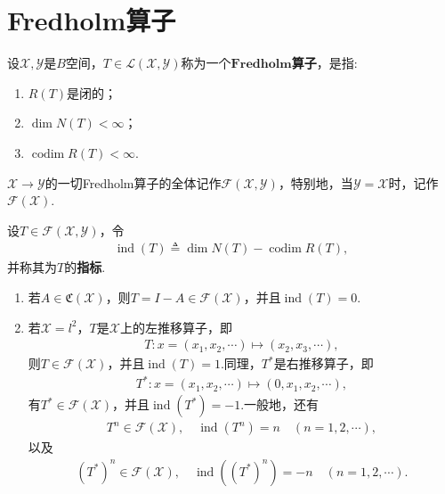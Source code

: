 \documentclass[../../main.tex]{subfiles}%
\begin{document}
\section{Fredholm算子}

\begin{definition}
设$\mathscr{X},\mathscr{Y}$是$B$空间，$T\in\mathscr{L}(\mathscr{X},\mathscr{Y})$称为一个$\mathbf{Fredholm}$\textbf{算子}，是指:
\begin{enumerate}[(1)]
\item $R(T)$是闭的；
\item $\dim N(T)<\infty$；
\item $\operatorname{codim}R(T)<\infty$.
\end{enumerate}
$\mathscr{X}\to\mathscr{Y}$的一切Fredholm算子的全体记作$\mathscr{F}(\mathscr{X},\mathscr{Y})$，特别地，当$\mathscr{Y}=\mathscr{X}$时，记作$\mathscr{F}(\mathscr{X})$.

设$T\in\mathscr{F}(\mathscr{X},\mathscr{Y})$，令
\begin{align*}
\operatorname{ind}(T)\triangleq\dim N(T)-\operatorname{codim}R(T),
\end{align*}
并称其为$T$的\textbf{指标}.
\end{definition}

\begin{examples}
\begin{enumerate}[(1)]
\item 若$A\in\mathfrak{C}(\mathscr{X})$，则$T=I-A\in\mathscr{F}(\mathscr{X})$，并且$\operatorname{ind}(T)=0$.
\item 若$\mathscr{X}=l^2$，$T$是$\mathscr{X}$上的左推移算子，即
\begin{align*}
T:x=(x_1,x_2,\cdots)\mapsto(x_2,x_3,\cdots),
\end{align*}
则$T\in\mathscr{F}(\mathscr{X})$，并且$\operatorname{ind}(T)=1$.同理，$T^*$是右推移算子，即
\begin{align*}
T^*:x=(x_1,x_2,\cdots)\mapsto(0,x_1,x_2,\cdots),
\end{align*}
有$T^*\in\mathscr{F}(\mathscr{X})$，并且$\operatorname{ind}(T^*)=-1$.一般地，还有
\begin{align*}
T^n\in\mathscr{F}(\mathscr{X}),\quad \operatorname{ind}(T^n)=n\quad (n=1,2,\cdots),
\end{align*}
以及
\begin{align*}
(T^*)^n\in\mathscr{F}(\mathscr{X}),\quad \operatorname{ind}((T^*)^n)=-n\quad (n=1,2,\cdots).
\end{align*}
\end{enumerate}
\end{examples}
\end{document}
